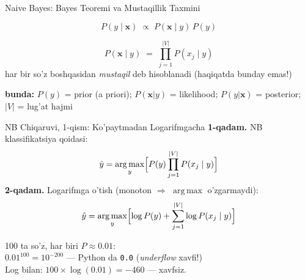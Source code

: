 \documentclass[aspectratio=169,11pt]{beamer}
\newcommand{\bunda}[1]{{\small\textbf{bunda:}\; #1}}
\begin{document}
\begin{frame}{Naive Bayes: Bayes Teoremi va Mustaqillik Taxmini}
  \begin{tcolorbox}[defbox,title=Bayes teoremi (klassifikatsiya uchun)]
    \[
      P(y\mid\mathbf{x})
      \;\propto\;
      P(\mathbf{x}\mid y)\,P(y)
    \]
  \end{tcolorbox}
  \vspace{2pt}
  \begin{tcolorbox}[defbox,title=``Naive'' --- Shartli Mustaqillik (CI) Taxmini]
    \[
      P(\mathbf{x}\mid y)
      \;=\;
      \prod_{j=1}^{|V|} P(x_j\mid y)
    \]
    \footnotesize\textcolor{halfgray}{
      har bir so'z boshqasidan \textit{mustaqil} deb hisoblanadi
      (haqiqatda bunday emas!)}
  \end{tcolorbox}
  \vspace{2pt}
  \bunda{%
    $P(y)$ = prior (a priori);\;
    $P(\mathbf{x}|y)$ = likelihood;\;
    $P(y|\mathbf{x})$ = posterior;\;
    $|V|$ = lug'at hajmi%
  }
\end{frame}

\begin{frame}{NB Chiqaruvi, 1-qism: Ko'paytmadan Logarifmgacha}
  \small
  \textbf{1-qadam.} NB klassifikatsiya qoidasi:
  \[
    \hat{y}
    =\operatorname*{arg\,max}_{y}
    \Bigl[P(y)\prod_{j=1}^{|V|}P(x_j\mid y)\Bigr]
  \]
  \pause
  \textbf{2-qadam.} Logarifmga o'tish
  (monoton $\Rightarrow$ $\operatorname{arg\,max}$ o'zgarmaydi):
  \[
    \hat{y}
    =\operatorname*{arg\,max}_{y}
    \Bigl[\log P(y) + \sum_{j=1}^{|V|}\log P(x_j\mid y)\Bigr]
  \]
  \pause
  \begin{tcolorbox}[warnbox,title=Nima uchun log?]
    \small
    100 ta so'z, har biri $P\!\approx\!0.01$:\\
    $0.01^{100}=10^{-200}$ --- Python da \texttt{0.0}
    (\textit{underflow} xavfi!)\\
    Log bilan: $100\times\log(0.01)=-460$ --- xavfsiz.
  \end{tcolorbox}
\end{frame}
\end{document}
